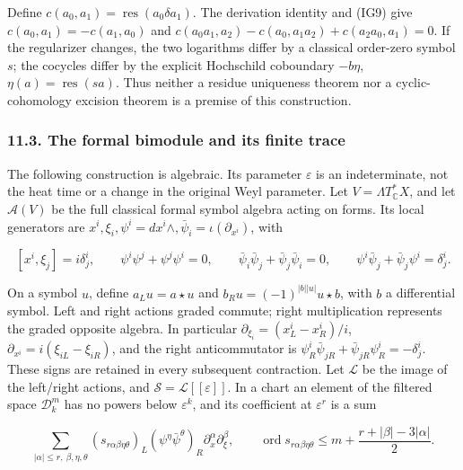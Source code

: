 \documentclass[
  11pt,
]{article}
\begin{document}
Define \(c(a_0,a_1)=\operatorname{res}(a_0\delta a_1)\). The derivation
identity and (IG9) give \(c(a_0,a_1)=-c(a_1,a_0)\) and
\(c(a_0a_1,a_2)-c(a_0,a_1a_2)+c(a_2a_0,a_1)=0\). If the regularizer
changes, the two logarithms differ by a classical order-zero symbol
\(s\); the cocycles differ by the explicit Hochschild coboundary
\(-b\eta\), \(\eta(a)=\operatorname{res}(sa)\). Thus neither a residue
uniqueness theorem nor a cyclic-cohomology excision theorem is a premise
of this construction.

\subsubsection{11.3. The formal bimodule and its finite
trace}\label{the-formal-bimodule-and-its-finite-trace}

The following construction is algebraic. Its parameter \(\varepsilon\)
is an indeterminate, not the heat time or a change in the original Weyl
parameter. Let \(V=\Lambda T^*_{\mathbb C}X\), and let \(\mathcal A(V)\)
be the full classical formal symbol algebra acting on forms. Its local
generators are
\(x^i,\xi_i,\psi^i=dx^i\wedge,\bar\psi_i=\iota(\partial_{x^i})\), with

\[
 [x^i,\xi_j]=i\delta^i_j,\qquad
 \psi^i\psi^j+\psi^j\psi^i=0,\qquad
 \bar\psi_i\bar\psi_j+\bar\psi_j\bar\psi_i=0,\qquad
 \psi^i\bar\psi_j+\bar\psi_j\psi^i=\delta^i_j.
\tag{IG11}
\]

On a symbol \(u\), define \(a_Lu=a\star u\) and
\(b_Ru=(-1)^{|b||u|}u\star b\), with \(b\) a differential symbol. Left
and right actions graded commute; right multiplication represents the
graded opposite algebra. In particular
\(\partial_{\xi_i}=(x^i_L-x^i_R)/i\),
\(\partial_{x^i}=i(\xi_{iL}-\xi_{iR})\), and the right anticommutator is
\(\psi_R^i\bar\psi_{jR}+\bar\psi_{jR}\psi_R^i=-\delta^i_j\). These signs
are retained in every subsequent contraction. Let \(\mathcal L\) be the
image of the left/right actions, and
\(\mathcal S=\mathcal L[[\varepsilon]]\). In a chart an element of the
filtered space \(\mathcal D^m_k\) has no powers below \(\varepsilon^k\),
and its coefficient at \(\varepsilon^r\) is a sum

\[
 \sum_{|\alpha|\leq r,\ \beta,\eta,\theta}
 (s_{r\alpha\beta\eta\theta})_L
 (\psi^\eta\bar\psi^\theta)_R
 \partial_x^\alpha\partial_\xi^\beta,
 \qquad
 \operatorname{ord}s_{r\alpha\beta\eta\theta}
       \leq m+\frac{r+|\beta|-3|\alpha|}{2}.
\tag{IG12}
\]
\end{document}
